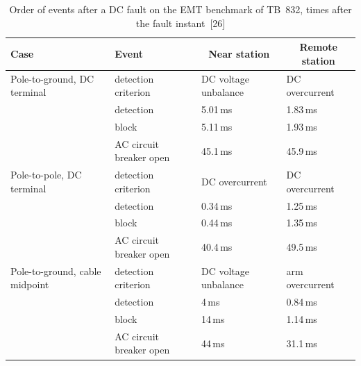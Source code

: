 \begin{table}[!ht]
  \centering
  \begin{tabular}{@{}l l l l@{}}
    \toprule
    \textbf{Case} & \textbf{Event}
      & \multicolumn{1}{c}{\textbf{Near station}} & \multicolumn{1}{c}{\textbf{Remote station}} \\
    \midrule
    Pole-to-ground, DC terminal
      & detection criterion     & DC voltage unbalance & DC overcurrent \\
      & detection               & 5.01\,ms  & 1.83\,ms \\
      & block                   & 5.11\,ms  & 1.93\,ms \\
      & AC circuit breaker open & 45.1\,ms  & 45.9\,ms \\
    \addlinespace
    Pole-to-pole, DC terminal
      & detection criterion     & DC overcurrent & DC overcurrent \\
      & detection               & 0.34\,ms  & 1.25\,ms \\
      & block                   & 0.44\,ms  & 1.35\,ms \\
      & AC circuit breaker open & 40.4\,ms  & 49.5\,ms \\
    \addlinespace
    Pole-to-ground, cable midpoint
      & detection criterion     & DC voltage unbalance & arm overcurrent \\
      & detection               & 4\,ms     & 0.84\,ms \\
      & block                   & 14\,ms    & 1.14\,ms \\
      & AC circuit breaker open & 44\,ms    & 31.1\,ms \\
    \bottomrule
  \end{tabular}
  \caption{Order of events after a DC fault on the EMT benchmark of
           TB~832, times after the fault instant~[26]}
  \label{tab:dcf-emt-events}
\end{table}

